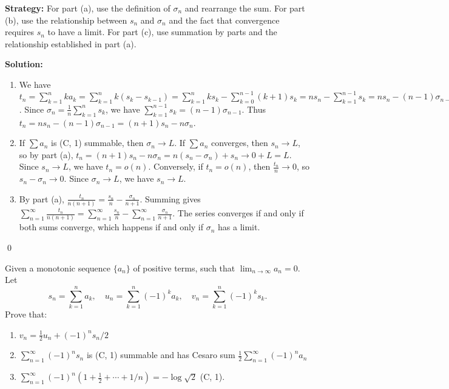 \noindent\textbf{Strategy:} For part (a), use the definition of \(\sigma_n\) and rearrange the sum. For part (b), use the relationship between \(s_n\) and \(\sigma_n\) and the fact that convergence requires \(s_n\) to have a limit. For part (c), use summation by parts and the relationship established in part (a).

\bigskip\noindent\textbf{Solution:}
\begin{enumerate}[label=(\alph*)]
\item We have \(t_n = \sum_{k=1}^n k a_k = \sum_{k=1}^n k(s_k - s_{k-1}) = \sum_{k=1}^n k s_k - \sum_{k=0}^{n-1} (k+1) s_k = n s_n - \sum_{k=1}^{n-1} s_k = n s_n - (n-1)\sigma_{n-1}\). Since \(\sigma_n = \frac{1}{n} \sum_{k=1}^n s_k\), we have \(\sum_{k=1}^{n-1} s_k = (n-1)\sigma_{n-1}\). Thus \(t_n = n s_n - (n-1)\sigma_{n-1} = (n+1)s_n - n\sigma_n\).

\item If \(\sum a_n\) is (C, 1) summable, then \(\sigma_n \to L\). If \(\sum a_n\) converges, then \(s_n \to L\), so by part (a), \(t_n = (n+1)s_n - n\sigma_n = n(s_n - \sigma_n) + s_n \to 0 + L = L\). Since \(s_n \to L\), we have \(t_n = o(n)\). Conversely, if \(t_n = o(n)\), then \(\frac{t_n}{n} \to 0\), so \(s_n - \sigma_n \to 0\). Since \(\sigma_n \to L\), we have \(s_n \to L\).

\item By part (a), \(\frac{t_n}{n(n+1)} = \frac{s_n}{n} - \frac{\sigma_n}{n+1}\). Summing gives \(\sum_{n=1}^{\infty} \frac{t_n}{n(n+1)} = \sum_{n=1}^{\infty} \frac{s_n}{n} - \sum_{n=1}^{\infty} \frac{\sigma_n}{n+1}\). The series converges if and only if both sums converge, which happens if and only if \(\sigma_n\) has a limit.
\end{enumerate}\qed



\begin{problembox}
Given a monotonic sequence \(\{a_n\}\) of positive terms, such that \(\lim_{n \to \infty} a_n = 0\). Let
\[s_n = \sum_{k=1}^{n} a_k, \quad u_n = \sum_{k=1}^{n} (-1)^k a_k, \quad v_n = \sum_{k=1}^{n} (-1)^k s_k.\]
Prove that:
\begin{enumerate}[label=\alph*)]
\item \(v_n = \frac{1}{2} u_n + (-1)^n s_n / 2\)
\item \(\sum_{n=1}^{\infty} (-1)^n s_n\) is (C, 1) summable and has Cesaro sum \(\frac{1}{2} \sum_{n=1}^{\infty} (-1)^n a_n\)
\item \(\sum_{n=1}^{\infty} (-1)^n (1 + \frac{1}{2} + \cdots + 1/n) = -\log \sqrt{2}\) (C, 1).
\end{enumerate}
\end{problembox}

